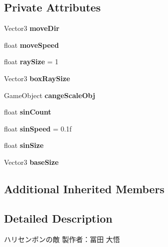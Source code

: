 \subsection*{Private Attributes}
\begin{DoxyCompactItemize}
\item 
\mbox{\label{class_globefish_a3c7c3e26663f1f279da56dc7e8973c98}} 
Vector3 {\bfseries move\+Dir}
\item 
\mbox{\label{class_globefish_a669540f9a2229682a49845dea8dec799}} 
float {\bfseries move\+Speed}
\item 
\mbox{\label{class_globefish_af25e96beb7f1c55e8950b9a5e9c2cf0e}} 
float {\bfseries ray\+Size} = 1
\item 
\mbox{\label{class_globefish_ae04f0e36c71f823bcc579dade44c0cbd}} 
Vector3 {\bfseries box\+Ray\+Size}
\item 
\mbox{\label{class_globefish_a6cd04576b3a17f999ad9c0e3691dd499}} 
Game\+Object {\bfseries cange\+Scale\+Obj}
\item 
\mbox{\label{class_globefish_aad6f1ecc4f55bb28c2e194759e111649}} 
float {\bfseries sin\+Count}
\item 
\mbox{\label{class_globefish_ad7d8a7a94fbcf945ddb230e5b3747edd}} 
float {\bfseries sin\+Speed} = 0.\+1f
\item 
\mbox{\label{class_globefish_acb03be63a8fb282691c9b35b73f5c43f}} 
float {\bfseries sin\+Size}
\item 
\mbox{\label{class_globefish_a73f52c5eed50e31e321fa82865c276fd}} 
Vector3 {\bfseries base\+Size}
\end{DoxyCompactItemize}
\subsection*{Additional Inherited Members}


\subsection{Detailed Description}
ハリセンボンの敵 製作者：冨田 大悟 



